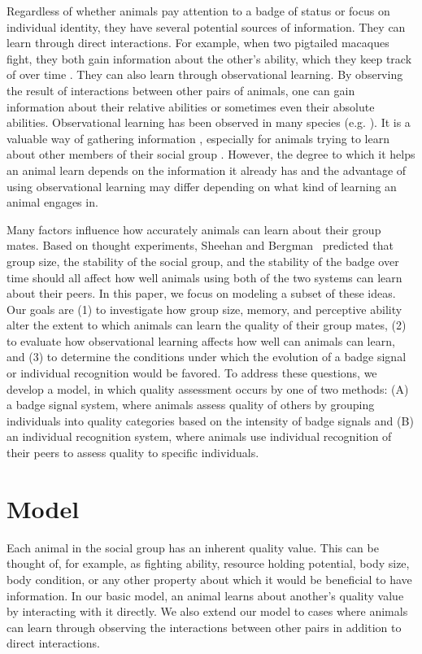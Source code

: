 Regardless of whether animals pay attention to a badge of status or focus on individual identity, they have several potential sources of information. They can learn through direct interactions. For example, when two pigtailed macaques fight, they both gain information about the other's ability, which they keep track of over time \cite{Flack:2007kx,Flack:2006uq}. They can also learn through observational learning. By observing the result of interactions between other pairs of animals, one can gain information about their relative abilities or sometimes even their absolute abilities. Observational learning has been observed in many species (e.g. \cite{Holekamp:1991nx,Hobson:2015uq,Fiorito:1992ve,Bugnyar:2002qf,Hopper:2008bh,Marchetti:2000dq,Gaudet:1984cr}). It is a valuable way of gathering information \cite{Holekamp:1991nx,Schaik:2011oq,Seyfarth2015SocialCognition}, especially for animals trying to learn about other members of their social group \cite{Freeman:1985kl,Holekamp:1991nx,Hobson:2015uq}. However, the degree to which it helps an animal learn depends on the information it already has and the advantage of using observational learning may differ depending on what kind of learning an animal engages in.


Many factors influence how accurately animals can learn about their group mates. Based on  thought experiments, Sheehan and Bergman~\cite{sheehan2016evotradeoff} predicted that group size, the stability of the social group, and the stability of the badge over time should all affect how well animals using both of the two systems can learn about their peers. In this paper, we focus on modeling a subset of these ideas. Our goals are (1) to investigate how group size, memory, and perceptive ability alter the extent to which animals can learn the quality of their group mates, (2) to evaluate how observational learning affects how well can animals can learn, and (3) to determine the conditions under which the evolution of a badge signal or individual recognition would be favored. To address these questions, we develop a model, in which quality assessment occurs by one of two methods: (A) a badge signal system, where animals assess quality of others by grouping individuals into quality categories based on the intensity of badge signals and (B) an individual recognition system, where animals use individual recognition of their peers to assess quality to specific individuals.  


\section*{Model} 
Each animal in the social group has an inherent quality value. This can be thought of, for example, as fighting ability, resource holding potential, body size, body condition, or any other property about which it would be beneficial to have information. In our basic model, an animal learns about another's quality value by interacting with it directly. We also extend our model to cases where animals can learn through observing the interactions between other pairs in addition to direct interactions. 

